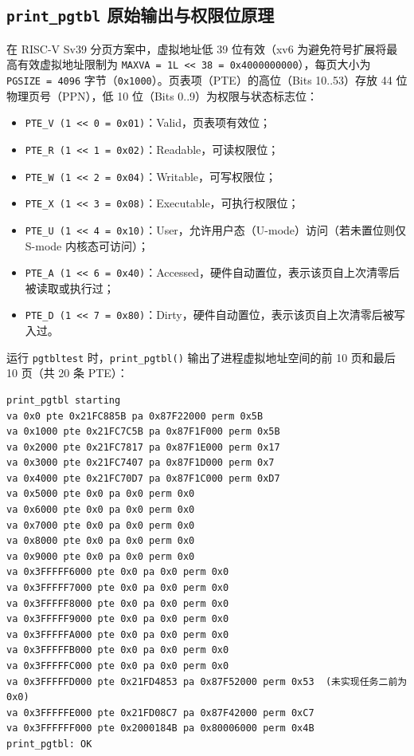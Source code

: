\documentclass[12pt, a4paper]{ctexart}
\begin{document}
\subsection{\texttt{print\_pgtbl} 原始输出与权限位原理}
在 RISC-V Sv39 分页方案中，虚拟地址低 39 位有效（xv6 为避免符号扩展将最高有效虚拟地址限制为 \texttt{MAXVA = 1L << 38 = 0x4000000000}），每页大小为 \texttt{PGSIZE = 4096} 字节（\texttt{0x1000}）。页表项（PTE）的高位（Bits 10..53）存放 44 位物理页号（PPN），低 10 位（Bits 0..9）为权限与状态标志位：
\begin{itemize}
    \item \texttt{PTE\_V (1 << 0 = 0x01)}：Valid，页表项有效位；
    \item \texttt{PTE\_R (1 << 1 = 0x02)}：Readable，可读权限位；
    \item \texttt{PTE\_W (1 << 2 = 0x04)}：Writable，可写权限位；
    \item \texttt{PTE\_X (1 << 3 = 0x08)}：Executable，可执行权限位；
    \item \texttt{PTE\_U (1 << 4 = 0x10)}：User，允许用户态（U-mode）访问（若未置位则仅 S-mode 内核态可访问）；
    \item \texttt{PTE\_A (1 << 6 = 0x40)}：Accessed，硬件自动置位，表示该页自上次清零后被读取或执行过；
    \item \texttt{PTE\_D (1 << 7 = 0x80)}：Dirty，硬件自动置位，表示该页自上次清零后被写入过。
\end{itemize}

运行 \texttt{pgtbltest} 时，\texttt{print\_pgtbl()} 输出了进程虚拟地址空间的前 10 页和最后 10 页（共 20 条 PTE）：
\begin{lstlisting}[language={}, caption={\texttt{print\_pgtbl} 终端输出}]
print_pgtbl starting
va 0x0 pte 0x21FC885B pa 0x87F22000 perm 0x5B
va 0x1000 pte 0x21FC7C5B pa 0x87F1F000 perm 0x5B
va 0x2000 pte 0x21FC7817 pa 0x87F1E000 perm 0x17
va 0x3000 pte 0x21FC7407 pa 0x87F1D000 perm 0x7
va 0x4000 pte 0x21FC70D7 pa 0x87F1C000 perm 0xD7
va 0x5000 pte 0x0 pa 0x0 perm 0x0
va 0x6000 pte 0x0 pa 0x0 perm 0x0
va 0x7000 pte 0x0 pa 0x0 perm 0x0
va 0x8000 pte 0x0 pa 0x0 perm 0x0
va 0x9000 pte 0x0 pa 0x0 perm 0x0
va 0x3FFFFF6000 pte 0x0 pa 0x0 perm 0x0
va 0x3FFFFF7000 pte 0x0 pa 0x0 perm 0x0
va 0x3FFFFF8000 pte 0x0 pa 0x0 perm 0x0
va 0x3FFFFF9000 pte 0x0 pa 0x0 perm 0x0
va 0x3FFFFFA000 pte 0x0 pa 0x0 perm 0x0
va 0x3FFFFFB000 pte 0x0 pa 0x0 perm 0x0
va 0x3FFFFFC000 pte 0x0 pa 0x0 perm 0x0
va 0x3FFFFFD000 pte 0x21FD4853 pa 0x87F52000 perm 0x53  (未实现任务二前为 0x0)
va 0x3FFFFFE000 pte 0x21FD08C7 pa 0x87F42000 perm 0xC7
va 0x3FFFFFF000 pte 0x2000184B pa 0x80006000 perm 0x4B
print_pgtbl: OK
\end{lstlisting}
\end{document}
